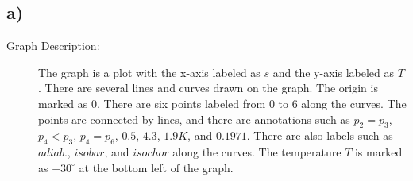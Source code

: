 

\subsection*{a)}

\begin{description}
    \item[Graph Description:] The graph is a plot with the x-axis labeled as $s$ and the y-axis labeled as $T$. There are several lines and curves drawn on the graph. The origin is marked as $0$. There are six points labeled from $0$ to $6$ along the curves. The points are connected by lines, and there are annotations such as $p_2 = p_3$, $p_4 < p_3$, $p_4 = p_6$, $0.5$, $4.3$, $1.9K$, and $0.1971$. There are also labels such as $adiab.$, $isobar$, and $isochor$ along the curves. The temperature $T$ is marked as $-30^\circ$ at the bottom left of the graph.
\end{description}